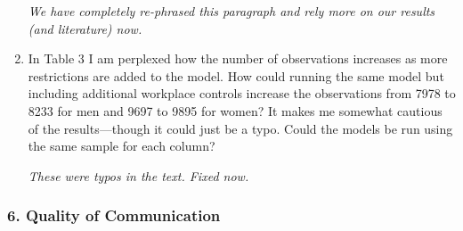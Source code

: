 \documentclass{article}
\newenvironment{response}
{\slshape}{}
\begin{document}
\begin{enumerate}
  \begin{response}
    We have completely re-phrased this paragraph and rely more on our
    results (and literature) now.
  \end{response}

\item In Table 3 I am perplexed how the number of observations increases as more restrictions are added to the model. How could running the same model but including additional workplace controls increase the observations from 7978 to 8233 for men and 9697 to 9895 for women? It makes me somewhat cautious of the results—though it could just be a typo. Could the models be run using the same sample for each column?

  \begin{response}
    These were typos in the text.  Fixed now.
  \end{response}

\end{enumerate}

\subsubsection*{6. Quality of Communication}
\end{document}

